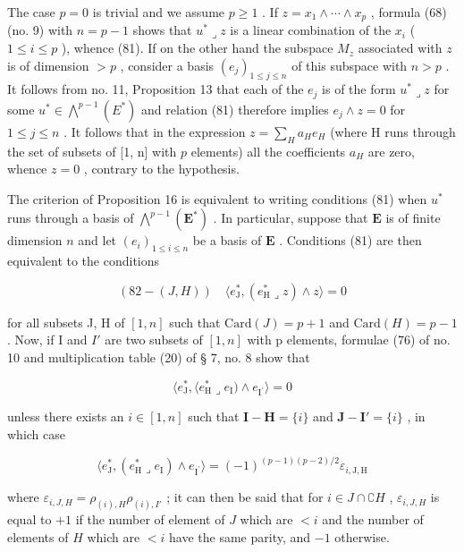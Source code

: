 The case \(p = 0\) is trivial and we assume \(p \geqslant 1\) . If \(z = x_1 \wedge \cdots \wedge x_p\) , formula (68) (no. 9) with \(n = p - 1\) shows that \(u^* \lrcorner z\) is a linear combination of the \(x_i\) ( \(1 \leqslant i \leqslant p\) ), whence (81). If on the other hand the subspace \(M_z\) associated with \(z\) is of dimension \(>p\) , consider a basis \((e_j)_{1 \leqslant j \leqslant n}\) of this subspace with \(n >p\) . It follows from no. 11, Proposition 13 that each of the \(e_j\) is of the form \(u^* \lrcorner z\) for some \(u^* \in \bigwedge^{p-1}(E^*)\) and relation (81) therefore implies \(e_j \wedge z = 0\) for \(1 \leqslant j \leqslant n\) . It follows that in the expression \(z = \sum_{H} a_H e_H\) (where H runs through the set of subsets of {[}1, n{]} with \(p\) elements) all the coefficients \(a_H\) are zero, whence \(z = 0\) , contrary to the hypothesis.

The criterion of Proposition 16 is equivalent to writing conditions (81) when \(u^*\) runs through a basis of \(\bigwedge^{p-1}(\mathbf{E}^*)\) . In particular, suppose that \(\mathbf{E}\) is of finite dimension \(n\) and let \((e_i)_{1\leq i\leq n}\) be a basis of \(\mathbf{E}\) . Conditions (81) are then equivalent to the conditions

\[
(82-(J, H)) \quad \langle e _ {\mathrm{J}} ^ {*}, (e _ {\mathrm{H}} ^ {*} \lrcorner z) \wedge z \rangle = 0
\]

for all subsets J, H of \([1, n]\) such that \(\text{Card}(J) = p + 1\) and \(\text{Card}(H) = p - 1\) . Now, if I and \(I'\) are two subsets of \([1, n]\) with p elements, formulae (76) of no. 10 and multiplication table (20) of § 7, no. 8 show that

\[
\langle e _ {\mathrm{J}} ^ {*}, \langle e _ {\mathrm{H}} ^ {*} \lrcorner e _ {\mathrm{I}}) \wedge e _ {\mathrm{I} ^ {\prime}} \rangle = 0
\]

unless there exists an \(i \in [1, n]\) such that \(\mathbf{I} - \mathbf{H} = \{i\}\) and \(\mathbf{J} - \mathbf{I}' = \{i\}\) , in which case

\[
\langle e _ {\mathrm{J}} ^ {*}, (e _ {\mathrm{H}} ^ {*} \lrcorner e _ {\mathrm{I}}) \wedge e _ {\mathrm{I} ^ {\prime}} \rangle = (- 1) ^ {(p - 1) (p - 2) / 2} \varepsilon_ {i, \mathrm{J,H}}\tag{83}
\]

where \(\varepsilon_{i,J,H} = \rho_{(i),H}\rho_{(i),I'}\) ; it can then be said that for \(i\in J\cap \complement H\) , \(\varepsilon_{i,J,H}\) is equal to \(+1\) if the number of element of \(J\) which are \(< i\) and the number of elements of \(H\) which are \(< i\) have the same parity, and \(-1\) otherwise.

